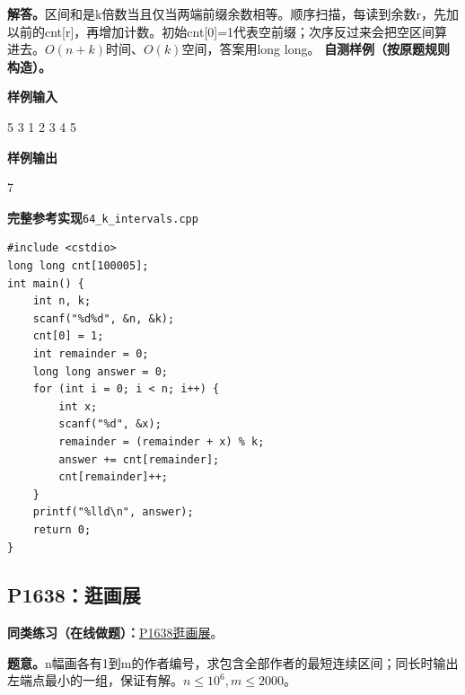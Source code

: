 \documentclass[UTF8,11pt,a4paper,fontset=none]{ctexart}
\newcommand{\practice}[2]{\par\noindent\textbf{同类练习（在线做题）：}\href{https://www.luogu.com.cn/problem/#1}{#1\quad #2}。\par}
\begin{document}
\noindent\textbf{解答。}区间和是k倍数当且仅当两端前缀余数相等。顺序扫描，每读到余数r，先加以前的cnt[r]，再增加计数。初始cnt[0]=1代表空前缀；次序反过来会把空区间算进去。$O(n+k)$时间、$O(k)$空间，答案用long long。
\textbf{自测样例（按原题规则构造）。}
\begin{tcolorbox}[samplebox,title={输入输出样例}]
\textbf{样例输入}
\begin{Sample}
5 3
1 2 3 4 5
\end{Sample}
\tcblower
\textbf{样例输出}
\begin{Sample}
7
\end{Sample}
\end{tcolorbox}
\par\noindent\begin{minipage}{\linewidth}
\textbf{完整参考实现}\quad\texttt{64\_k\_intervals.cpp}
\begin{lstlisting}
#include <cstdio>
long long cnt[100005];
int main() {
    int n, k;
    scanf("%d%d", &n, &k);
    cnt[0] = 1;
    int remainder = 0;
    long long answer = 0;
    for (int i = 0; i < n; i++) {
        int x;
        scanf("%d", &x);
        remainder = (remainder + x) % k;
        answer += cnt[remainder];
        cnt[remainder]++;
    }
    printf("%lld\n", answer);
    return 0;
}
\end{lstlisting}
\end{minipage}\par


\subsection{P1638：逛画展}

\practice{P1638}{逛画展}

\noindent\textbf{题意。}n幅画各有1到m的作者编号，求包含全部作者的最短连续区间；同长时输出左端点最小的一组，保证有解。$n\le10^6,m\le2000$。
\end{document}
